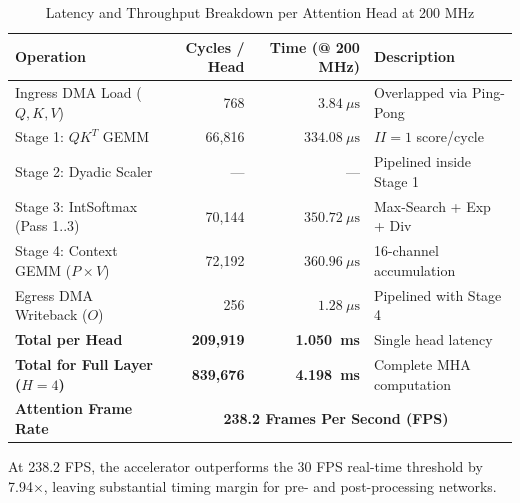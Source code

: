 \begin{table}[htbp]
    \centering
    \caption{Latency and Throughput Breakdown per Attention Head at 200 MHz}
    \label{tab:latency_breakdown}
    \begin{tabularx}{\textwidth}{l r r X}
        \toprule
        \textbf{Operation} & \textbf{Cycles / Head} & \textbf{Time (@ 200 MHz)} & \textbf{Description} \\
        \midrule
        Ingress DMA Load ($Q, K, V$) & 768   & $3.84\ \mu\text{s}$  & Overlapped via Ping-Pong \\
        Stage 1: $QK^T$ GEMM         & 66,816 & $334.08\ \mu\text{s}$ & $II = 1$ score/cycle \\
        Stage 2: Dyadic Scaler       & —      & —                    & Pipelined inside Stage 1 \\
        Stage 3: IntSoftmax (Pass 1..3)& 70,144& $350.72\ \mu\text{s}$ & Max-Search + Exp + Div \\
        Stage 4: Context GEMM ($P \times V$) & 72,192 & $360.96\ \mu\text{s}$ & 16-channel accumulation \\
        Egress DMA Writeback ($O$)   & 256    & $1.28\ \mu\text{s}$  & Pipelined with Stage 4 \\
        \midrule
        \textbf{Total per Head}      & \textbf{209,919} & \textbf{1.050~ms} & Single head latency \\
        \textbf{Total for Full Layer ($H=4$)} & \textbf{839,676} & \textbf{4.198~ms} & Complete MHA computation \\
        \midrule
        \textbf{Attention Frame Rate}& \multicolumn{3}{c}{\textbf{238.2 Frames Per Second (FPS)}} \\
        \bottomrule
    \end{tabularx}
\end{table}

At 238.2 FPS, the accelerator outperforms the 30 FPS real-time threshold by 7.94$\times$, leaving substantial timing margin for pre- and post-processing networks.

